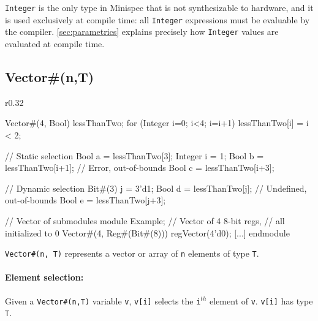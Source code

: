 \verb|Integer| is the only type in Minispec that is not synthesizable to hardware, and it is used exclusively at compile time:
all \verb|Integer| expressions must be evaluable by the compiler.
\autoref{sec:parametrics} explains precisely how \verb|Integer| values are evaluated at compile time.

\subsection{Vector\#(n,T)}
\label{sec:vector}

\begin{wrapfigure}{r}{0.32\columnwidth}
\vspace{-4em}
\begin{mscode}
Vector#(4, Bool) lessThanTwo;
for (Integer i=0; i<4; i=i+1)
  lessThanTwo[i] = i < 2;

// Static selection
Bool a = lessThanTwo[3];
Integer i = 1;
Bool b = lessThanTwo[i+1];
// Error, out-of-bounds
Bool c = lessThanTwo[i+3];

// Dynamic selection
Bit#(3) j = 3'd1;
Bool d = lessThanTwo[j];
// Undefined, out-of-bounds
Bool e = lessThanTwo[j+3];

// Vector of submodules
module Example;
  // Vector of 4 8-bit regs,
  // all initialized to 0
  Vector#(4, Reg#(Bit#(8)))
    regVector(4'd0);
  [...]
endmodule
\end{mscode}
\vspace{-6em}
\end{wrapfigure}

\verb|Vector#(n, T)| represents a vector or array of \verb|n| elements of type \verb|T|.

\paragraph{Element selection:} 
Given a \verb|Vector#(n,T)| variable \verb|v|,
\verb|v[i]| selects the \verb|i|$^{th}$ element of \verb|v|.
\verb|v[i]| has type \verb|T|.


